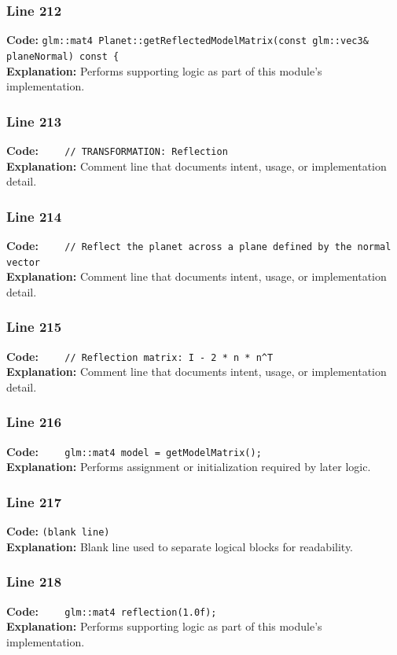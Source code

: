 \documentclass[11pt,a4paper]{article}
\begin{document}
\subsubsection*{Line 212}
\textbf{Code:} \verb|glm::mat4 Planet::getReflectedModelMatrix(const glm::vec3& planeNormal) const {|\\
\textbf{Explanation:} Performs supporting logic as part of this module's implementation.

\subsubsection*{Line 213}
\textbf{Code:} \verb|    // TRANSFORMATION: Reflection|\\
\textbf{Explanation:} Comment line that documents intent, usage, or implementation detail.

\subsubsection*{Line 214}
\textbf{Code:} \verb|    // Reflect the planet across a plane defined by the normal vector|\\
\textbf{Explanation:} Comment line that documents intent, usage, or implementation detail.

\subsubsection*{Line 215}
\textbf{Code:} \verb|    // Reflection matrix: I - 2 * n * n^T|\\
\textbf{Explanation:} Comment line that documents intent, usage, or implementation detail.

\subsubsection*{Line 216}
\textbf{Code:} \verb|    glm::mat4 model = getModelMatrix();|\\
\textbf{Explanation:} Performs assignment or initialization required by later logic.

\subsubsection*{Line 217}
\textbf{Code:} \texttt{(blank line)}\\
\textbf{Explanation:} Blank line used to separate logical blocks for readability.

\subsubsection*{Line 218}
\textbf{Code:} \verb|    glm::mat4 reflection(1.0f);|\\
\textbf{Explanation:} Performs supporting logic as part of this module's implementation.
\end{document}
